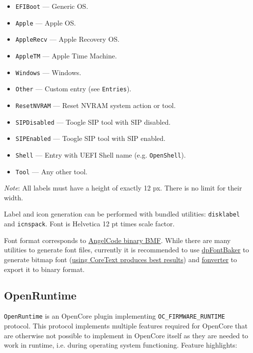 \documentclass[]{article}
\providecommand{\tightlist}{%
  \setlength{\itemsep}{0pt}\setlength{\parskip}{0pt}}
\begin{document}
\begin{itemize}
\tightlist
  \item \texttt{EFIBoot} --- Generic OS.
  \item \texttt{Apple} --- Apple OS.
  \item \texttt{AppleRecv} --- Apple Recovery OS.
  \item \texttt{AppleTM} --- Apple Time Machine.
  \item \texttt{Windows} --- Windows.
  \item \texttt{Other} --- Custom entry (see \texttt{Entries}).
  \item \texttt{ResetNVRAM} --- Reset NVRAM system action or tool.
  \item \texttt{SIPDisabled} --- Toogle SIP tool with SIP disabled.
  \item \texttt{SIPEnabled} --- Toogle SIP tool with SIP enabled.
  \item \texttt{Shell} --- Entry with UEFI Shell name (e.g. \texttt{OpenShell}).
  \item \texttt{Tool} --- Any other tool.
\end{itemize}

\emph{Note}: All labels must have a height of exactly 12 px. There is no limit for their width.

Label and icon generation can be performed with bundled utilities: \texttt{disklabel} and
\texttt{icnspack}. Font is Helvetica 12 pt times scale factor.

Font format corresponds to \href{https://www.angelcode.com/products/bmfont}{AngelCode binary BMF}.
While there are many utilities to generate font files, currently it is recommended to use
\href{https://github.com/danpla/dpfontbaker}{dpFontBaker} to generate bitmap font
(\href{https://github.com/danpla/dpfontbaker/pull/1}{using CoreText produces best results})
and \href{https://github.com/usr-sse2/fonverter}{fonverter} to export it to binary format.

\subsection{OpenRuntime}\label{uefiruntime}

\texttt{OpenRuntime} is an OpenCore plugin implementing \texttt{OC\_FIRMWARE\_RUNTIME} protocol.
This protocol implements multiple features required for OpenCore that are otherwise not possible
to implement in OpenCore itself as they are needed to work in runtime, i.e. during operating system
functioning. Feature highlights:
\end{document}
